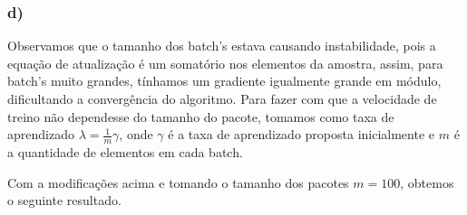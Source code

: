\documentclass[
]{article}
\begin{document}
\hypertarget{d-2}{%
\subsubsection{d)}\label{d-2}}

Observamos que o tamanho dos batch's estava causando instabilidade, pois
a equação de atualização é um somatório nos elementos da amostra, assim,
para batch's muito grandes, tínhamos um gradiente igualmente grande em
módulo, dificultando a convergência do algoritmo. Para fazer com que a
velocidade de treino não dependesse do tamanho do pacote, tomamos como
taxa de aprendizado \(\lambda=\frac{1}{m}\gamma\), onde \(\gamma\) é a
taxa de aprendizado proposta inicialmente e \(m\) é a quantidade de
elementos em cada batch.

Com a modificações acima e tomando o tamanho dos pacotes \(m=100\),
obtemos o seguinte resultado.
\end{document}
